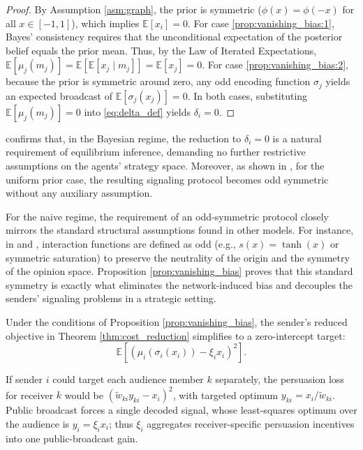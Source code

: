 \documentclass[journal,twoside,web]{ieeecolor}
\begin{document}
\begin{proof}
    By Assumption \ref{asm:graph}, the prior is symmetric ($\phi(x) = \phi(-x)$ for all $x \in [-1,1]$), which implies $\mathbb{E}[x_i] = 0$.
    For case \ref{prop:vanishing_bias:1}, Bayes' consistency requires that the unconditional expectation of the posterior belief equals the prior mean. Thus, by the Law of Iterated Expectations, $\mathbb{E}[\mu_j(m_j)] = \mathbb{E}[\mathbb{E}[x_j \mid m_j]] = \mathbb{E}[x_j] = 0$.
    For case \ref{prop:vanishing_bias:2}, because the prior is symmetric around zero, any odd encoding function $\sigma_j$ yields an expected broadcast of $\mathbb{E}[\sigma_j(x_j)] = 0$.
    In both cases, substituting $\mathbb{E}[\mu_j(m_j)] = 0$ into \eqref{eq:delta_def} yields $\delta_i = 0$.
\end{proof}

 confirms that, in the Bayesian regime, the reduction to $\delta_i = 0$ is a natural requirement of equilibrium inference, demanding no further restrictive assumptions on the agents' strategy space. Moreover, as shown in , for the uniform prior case, the resulting signaling protocol becomes odd symmetric without any auxiliary assumption.

For the naive regime, the requirement of an odd-symmetric protocol closely mirrors the standard structural assumptions found in other models. For instance, in \cite{bizyaeva2023nonlinear} and \cite{couthures2025from}, interaction functions are defined as odd (e.g., $s(x) = \tanh(x)$ or symmetric saturation) to preserve the neutrality of the origin and the symmetry of the opinion space. Proposition \ref{prop:vanishing_bias} proves that this standard symmetry is exactly what eliminates the network-induced bias and decouples the senders' signaling problems in a strategic setting.

\begin{corollary}
    \label{cor:centered_scalar_target}
    Under the conditions of Proposition \ref{prop:vanishing_bias}, the sender's reduced objective in Theorem \ref{thm:cost_reduction} simplifies to a zero-intercept target:
    \begin{equation}
        \label{eq:centered_target}
        \mathbb E\left[ \left(\mu_i(\sigma_i(x_i))-\xi_i x_i\right)^2 \right].
    \end{equation}
\end{corollary}

\begin{remark}
    \label{rem:targeted}
    If sender $i$ could target each audience member $k$ separately, the persuasion loss for receiver $k$ would be $(\widetilde{w}_{ki}y_{ki}-x_i)^2$, with targeted optimum $y_{ki}=x_i/\widetilde{w}_{ki}$. Public broadcast forces a single decoded signal, whose least-squares optimum over the audience is $y_i=\xi_i x_i$; thus $\xi_i$ aggregates receiver-specific persuasion incentives into one public-broadcast gain.
\end{remark}
\end{document}
